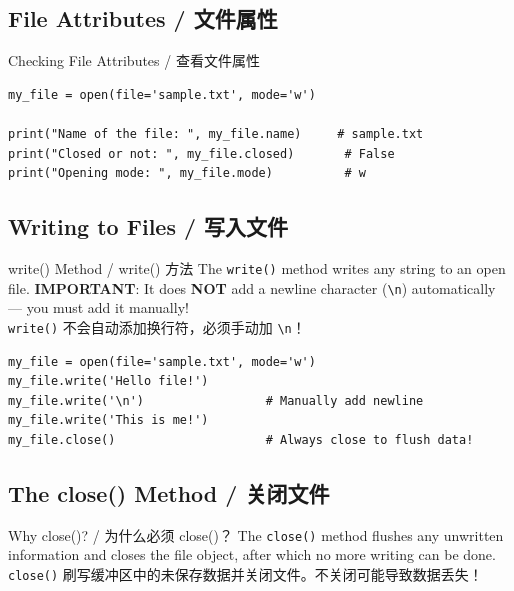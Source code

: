 \documentclass[11pt,a4paper]{report}
\let\oldtexttt\texttt
\renewcommand{\texttt}[1]{\textcolor{mainblue}{\oldtexttt{#1}}}
\begin{document}
\subsection{File Attributes / 文件属性}

\begin{examplebox}{Checking File Attributes / 查看文件属性}
\begin{lstlisting}
my_file = open(file='sample.txt', mode='w')

print("Name of the file: ", my_file.name)     # sample.txt
print("Closed or not: ", my_file.closed)       # False
print("Opening mode: ", my_file.mode)          # w
\end{lstlisting}
\end{examplebox}

\subsection{Writing to Files / 写入文件}

\begin{examplebox}{write() Method / write() 方法}
    The \texttt{write()} method writes any string to an open file. \textbf{IMPORTANT}: It does \textbf{NOT} add a newline character (\texttt{\textbackslash n}) automatically — you must add it manually! \\
    \texttt{write()} 不会自动添加换行符，必须手动加 \texttt{\textbackslash n}！
\begin{lstlisting}
my_file = open(file='sample.txt', mode='w')
my_file.write('Hello file!')
my_file.write('\n')                 # Manually add newline
my_file.write('This is me!')
my_file.close()                     # Always close to flush data!
\end{lstlisting}
\end{examplebox}

\subsection{The close() Method / 关闭文件}

\begin{concept}{Why close()? / 为什么必须 close()？}
    The \texttt{close()} method flushes any unwritten information and closes the file object, after which no more writing can be done. \\
    \texttt{close()} 刷写缓冲区中的未保存数据并关闭文件。不关闭可能导致数据丢失！
\end{concept}

\end{document}
